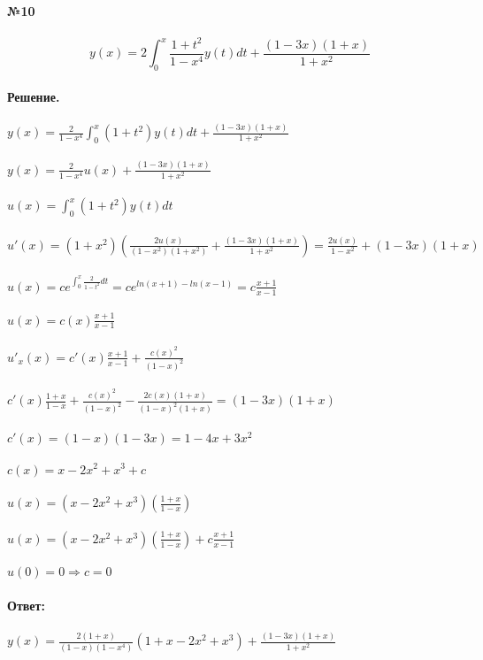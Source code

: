 \documentclass[10pt,a4paper]{article}
\begin{document}
	\noindent\textbf{№10} \\ \\
	$$y(x)=2 \int_{0}^{x}\frac{1+t^2}{1-x^4}y(t)dt+\frac{(1-3x)(1+x)}{1+x^2}$$ \\
	\textbf{Решение.} \\ \\
	$y(x)=\frac{2}{1-x^4}\int_{0}^{x}(1+t^2)y(t)dt+\frac{(1-3x)(1+x)}{1+x^2}$\\ \\
	$y(x)=\frac{2}{1-x^4}u(x)+\frac{(1-3x)(1+x)}{1+x^2}$\\ \\
	$u(x)=\int_{0}^{x}(1+t^2)y(t)dt$\\ \\
	$u'(x)=(1+x^2)(\frac{2u(x)}{(1-x^2)(1+x^2)}+\frac{(1-3x)(1+x)}{1+x^2})=\frac{2u(x)}{1-x^2}+(1-3x)(1+x)$ \\ \\
	$u(x)=ce^{\int_{0}^{x}\frac{2}{1-t^2}dt}=ce^{ln(x+1)-ln(x-1)}=c\frac{x+1}{x-1}$ \\  \\
	$u(x)=c(x)\frac{x+1}{x-1}$\\ \\
	$u'_x(x)=c'(x)\frac{x+1}{x-1}+\frac{c(x)^2}{(1-x)^2}$\\ \\
	$c'(x)\frac{1+x}{1-x}+\frac{c(x)^2}{(1-x)^2}-\frac{2c(x)(1+x)}{(1-x)^2(1+x)}=(1-3x)(1+x)$\\ \\
	$c'(x)=(1-x)(1-3x)=1-4x+3x^2$\\ \\
	$c(x)=x-2x^2+x^3+c$\\ \\
	$u(x)=(x-2x^2+x^3)(\frac{1+x}{1-x})$\\ \\
	$u(x)=(x-2x^2+x^3)(\frac{1+x}{1-x})+c\frac{x+1}{x-1}$\\ \\
	$u(0)=0 \Rightarrow c=0$\\ \\
	\textbf{Ответ:} \\ \\
	$y(x)=\frac{2(1+x)}{(1-x)(1-x^4)}(1+x-2x^2+x^3)+\frac{(1-3x)(1+x)}{1+x^2}$ \\ \\
	
\end{document}
